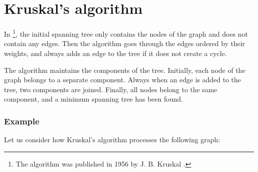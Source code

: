 \section{Kruskal's algorithm}


In \footnote{The algorithm was published in 1956
by J. B. Kruskal \cite{kru56}.}, the initial spanning tree
only contains the nodes of the graph
and does not contain any edges.
Then the algorithm goes through the edges
ordered by their weights, and always adds an edge
to the tree if it does not create a cycle.

The algorithm maintains the components
of the tree.
Initially, each node of the graph
belongs to a separate component.
Always when an edge is added to the tree,
two components are joined.
Finally, all nodes belong to the same component,
and a minimum spanning tree has been found.

\subsubsection{Example}

\begin{samepage}
Let us consider how Kruskal's algorithm processes the
following graph:
\begin{center}
\end{center}
\end{samepage}

